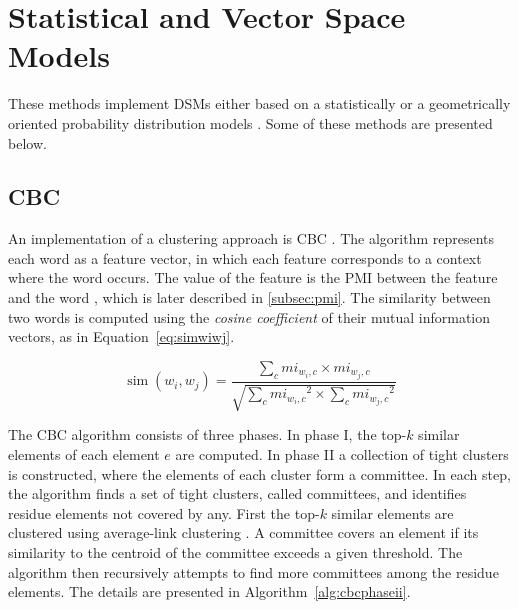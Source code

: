 \section{Statistical and Vector Space Models}
\label{sec:vectorspace}

These methods implement \acp{DSM} either based on a statistically or a 
geometrically  oriented probability distribution models \citep{van2010mining}. 
Some of these methods are presented below.

\subsection{\acl*{CBC}}

An implementation of a clustering approach is \ac{CBC} 
\citep{pantel2003clustering}. The algorithm represents each word as a feature 
vector, in which each feature corresponds to a context where the word occurs. 
The value of the feature is the \ac{PMI} between the feature and the word 
\citep{bouma2009normalized}, which is later described in \ref{subsec:pmi}. The 
similarity between two words is computed using the \textit{cosine coefficient} 
\citep{salton1986introduction} of their mutual information vectors, as in 
Equation~\ref{eq:simwiwj}.

\begin{equation}
\operatorname{sim}(w_i,w_j) = \frac{\sum_c mi_{w_i,c} \times mi_{w_j,c}}
                    {\sqrt{\sum_c{mi_{w_i,c}}^2 \times \sum_c{mi_{w_j,c}}^2}}
\label{eq:simwiwj}
\end{equation}

The \ac{CBC} algorithm consists of three phases. In phase I, the top-$k$ 
similar elements of each element $e$ are computed. In phase II a collection of 
tight clusters is constructed, where the elements of each cluster form a 
committee. In each step, the algorithm finds a set of tight clusters, called 
committees, and identifies residue elements not covered by any. First the 
top-$k$ similar elements are clustered using average-link clustering 
\citep{han2000data}. A committee covers an element if its similarity to the 
centroid of the committee exceeds a given threshold. The algorithm then 
recursively attempts to find more committees among the residue elements. The 
details are presented in Algorithm~\ref{alg:cbcphaseii}.

